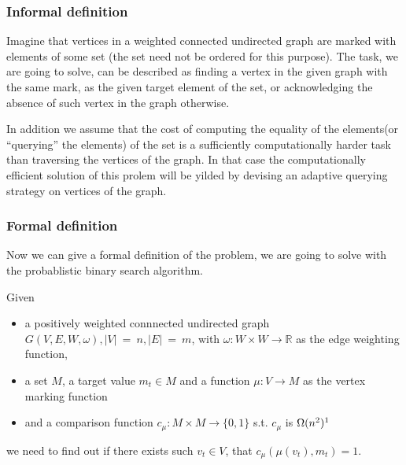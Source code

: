 \subsubsection*{Informal definition}
Imagine that vertices in a weighted connected undirected graph are marked with elements of some set (the set need not be ordered for this purpose). The task, we are going to solve, can be described as finding a vertex in the given graph with the same mark, as the given target element of the set, or acknowledging the absence of such vertex in the graph otherwise.


In addition we assume that the cost of computing the equality of the elements(or ``querying'' the elements) of the set is a sufficiently computationally harder task than traversing the vertices of the graph. In that case the computationally efficient solution of this prolem will be yilded by devising an adaptive querying strategy on vertices of the graph.


\subsubsection*{Formal definition}
Now we can give a formal definition of the problem, we are going to solve with the probablistic binary search algorithm.
\begin{definition}
Given
\begin{itemize}
  \item a positively weighted connnected undirected graph $G(V, E, W, \omega), |V|~=~n, |E|~=~m$, with $\omega: W \times W \rightarrow \mathds{R}$ as the edge weighting function,
  \item a set $M$, a target value $m_t \in M$ and a function $\mu: V \rightarrow M$ as the vertex marking function
  \item and a comparison function $c_\mu: M \times M \rightarrow \{0, 1\}$ s.t. $c_\mu$ is $\Omega(n^2)\footnotemark[1]$
\end{itemize}
we need to find out if there exists such $v_t \in V$, that $c_\mu(\mu(v_t), m_t) = 1$.
\label{problem_def}
\end{definition}

